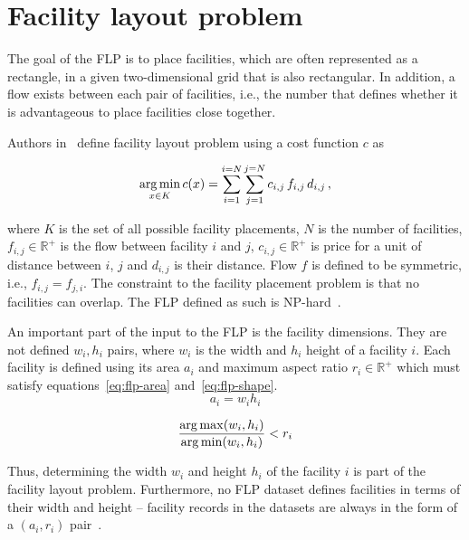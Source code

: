 \section{Facility layout problem}\label{sec:facility-layout-problem}

The goal of the FLP is to place facilities, which are often represented as a rectangle,
in a given two-dimensional grid that is also rectangular.
In addition, a flow exists between each pair of facilities, i.e., the number that defines whether it is advantageous to place facilities close together.

Authors in~\cite{goncalvesBiasedRandomkeyGenetic2015} define facility layout problem using a cost function $c$ as

\begin{equation}
    \operatorname*{arg\,min}_{x \in K} c(x) = \sum\limits_{i=1}^{i=N}\sum\limits_{j=1}^{j=N}c_{i,j}\,f_{i,j}\,d_{i,j}\,,
    \label{eq:flp-objective}
\end{equation}

where $K$ is the set of all possible facility placements, $N$ is the number of facilities, $f_{i,j} \in \mathbb{R^+}$ is the flow between facility $i$ and $j$, $c_{i,j} \in \mathbb{R^+}$
is price for a unit of distance between $i$, $j$ and $d_{i,j}$ is their distance.
Flow $f$ is defined to be symmetric, i.e., $f_{i,j} = f_{j,i}$.
The constraint to the facility placement problem is that no facilities can overlap.
The FLP defined as such is NP-hard~\cite{liuMultiobjectiveParticleSwarm2018, goncalvesBiasedRandomkeyGenetic2015, friedrichIntegratedSlicingTree2018}.

An important part of the input to the FLP is the facility dimensions.
They are not defined $w_i, h_i$ pairs, where $w_i$ is the width and $h_i$ height of a facility $i$.
Each facility is defined using its area $a_i$ and maximum aspect ratio $r_i \in \mathbb{R^+}$ which must satisfy equations~\ref{eq:flp-area} and~\ref{eq:flp-shape}.
\begin{equation}
    a_i = w_i h_i
    \label{eq:flp-area}
\end{equation}

\begin{equation}
    \dfrac{\operatorname*{arg\,max}(w_i, h_i)}{\operatorname*{arg\,min}(w_i, h_i)} < r_i
    \label{eq:flp-shape}
\end{equation}

Thus, determining the width $w_i$ and height $h_i$ of the facility $i$ is part of the facility layout problem.
Furthermore, no FLP dataset defines facilities in terms of their width and height
– facility records in the datasets are always in the form of a $(a_i, r_i)$ pair~\cite{tamHierarchicalApproachFacility1991, dunkerCoevolutionaryAlgorithmFacility2003, liuSequencepairRepresentationMIPmodelbased2007}.

